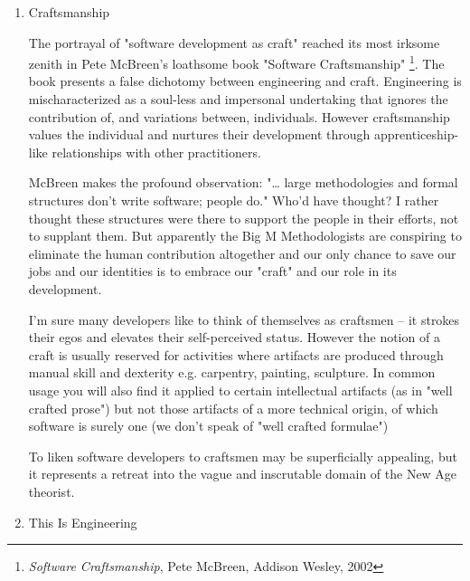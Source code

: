 \documentclass{article}
\begin{document}
\begin{enumerate}
One keeps waiting for the admission that all this armchair
philosophizing is just self-deprecating jest, but it seems it is not
going to be forthcoming. If you need a laugh, I'd encourage you read
Kent Beck's message to a young extremist \footnote{\url{http://c2.com/cgi/wiki?ToAyoungExtremist}} and the comments that
follow it. A greater pile of pseudo-intellectual backslapping you will
not find anywhere outside of the self-congratulatory annals of the New
Age movement.

\item Craftsmanship
\label{sec:orgheadline201}

The portrayal of "software development as craft" reached its most
irksome zenith in Pete McBreen's loathsome book "Software
Craftsmanship" \footnote{\emph{Software Craftsmanship}, Pete McBreen, Addison Wesley, 2002}. The book presents a false dichotomy between
engineering and craft. Engineering is mischaracterized as a soul-less
and impersonal undertaking that ignores the contribution of, and
variations between, individuals. However craftsmanship values the
individual and nurtures their development through apprenticeship-like
relationships with other practitioners.

McBreen makes the profound observation: "\ldots{} large methodologies and
formal structures don't write software; people do." Who'd have thought?
I rather thought these structures were there to support the people in
their efforts, not to supplant them. But apparently the Big M
Methodologists are conspiring to eliminate the human contribution
altogether and our only chance to save our jobs and our identities is to
embrace our "craft" and our role in its development.

I'm sure many developers like to think of themselves as craftsmen -- it
strokes their egos and elevates their self-perceived status. However the
notion of a craft is usually reserved for activities where artifacts are
produced through manual skill and dexterity e.g. carpentry, painting,
sculpture. In common usage you will also find it applied to certain
intellectual artifacts (as in "well crafted prose") but not those
artifacts of a more technical origin, of which software is surely one
(we don't speak of "well crafted formulae")

To liken software developers to craftsmen may be superficially
appealing, but it represents a retreat into the vague and inscrutable
domain of the New Age theorist.

\item This Is Engineering
\label{sec:orgheadline202}


\end{enumerate}
\end{document}
